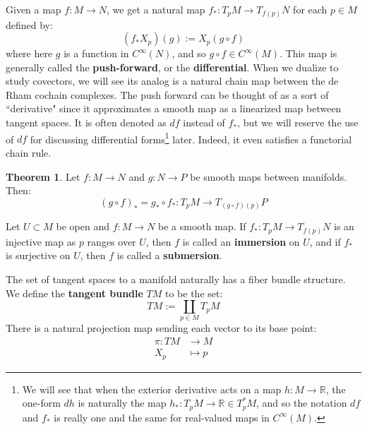 \documentclass[11pt, oneside]{article}   	%
\theoremstyle{definition}
\newtheorem{theorem}{Theorem}[section]
\begin{document}
Given a map $f : M\rightarrow N$, we get a natural map $f_* : T_p M\rightarrow T_{f(p)} N$ for each $p\in M$ defined by:
\begin{equation}
	(f_*X_p)(g) := X_p(g\circ f)
\end{equation}
where here $g$ is a function in $C^\infty(N)$, and so $g\circ f\in C^\infty(M)$. This map is generally called the 
\textbf{push-forward}, or the \textbf{differential}. When we dualize to study covectors, we will see its analog is a natural chain 
map between the de Rham cochain complexes. The push forward can be thought of as a sort of ``derivative" since it 
approximates a smooth map as a linearized map between tangent spaces. It is often denoted as $df$ instead of $f_*$, but 
we will reserve the use of $df$ for discussing differential forms\footnote{We will see that when the exterior derivative acts on a 
map $h : M\rightarrow\mathbb R$, the one-form $dh$ is naturally the map $h_* : T_p M\rightarrow\mathbb R\in T_p^* M$, and 
so the notation $df$ and $f_*$ is really one and the same for real-valued maps in $C^\infty(M)$.} later. Indeed, it even 
satisfies a functorial chain rule.
\begin{theorem}
	Let $f : M\rightarrow N$ and $g : N\rightarrow P$ be smooth maps between manifolds. Then:
	\begin{equation}
		(g\circ f)_* = g_*\circ f_* : T_p M\rightarrow T_{(g\circ f)(p)}P
	\end{equation}
\end{theorem}
Let $U\subset M$ be open and $f : M\rightarrow N$ be a smooth map. If $f_* : T_p M\rightarrow T_{f(p)}N$ is an injective map 
as $p$ ranges over $U$, then $f$ is called an \textbf{immersion} on $U$, and if $f_*$ is surjective on $U$, then $f$ is 
called a \textbf{submersion}. 

The set of tangent spaces to a manifold naturally has a fiber bundle structure. We define the \textbf{tangent bundle} $TM$ to 
be the set:
\begin{equation}
	TM := \coprod_{p\in M} T_p M
\end{equation}
There is a natural projection map sending each vector to its base point:
\begin{align}
	\pi : TM &\rightarrow M \\
		X_p &\mapsto p
\end{align}
\end{document}
